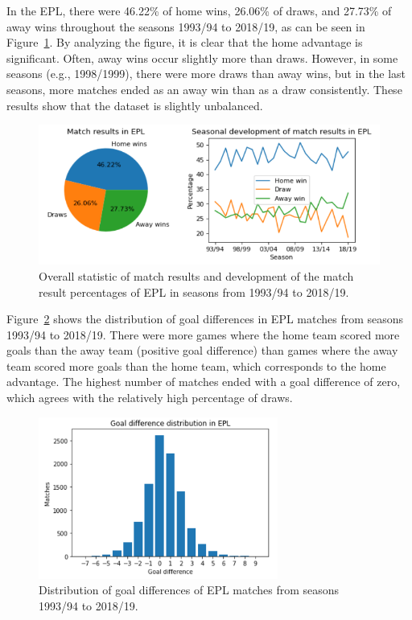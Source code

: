 \documentclass[thesis=M,english]{FITthesis}[2019/12/23]
\begin{document}
In the EPL, there were 46.22\% of home wins, 26.06\% of draws, and 27.73\% of away wins throughout the seasons 1993/94 to 2018/19, as can be seen in Figure~\ref{fig:epl_mr}. By analyzing the figure, it is clear that the home advantage is significant. Often, away wins occur slightly more than draws. However, in some seasons (e.g., 1998/1999), there were more draws than away wins, but in the last seasons, more matches ended as an away win than as a draw consistently. These results show that the dataset is slightly unbalanced.%
\begin{figure}[h]
    \centering
    \includegraphics[width=1\textwidth]{figures/epl_subgraph.png}
    \caption{Overall statistic of match results and development of the match result percentages of EPL in seasons from 1993/94 to 2018/19.}
    \label{fig:epl_mr}
\end{figure}

Figure~\ref{fig:epl_gd} shows the distribution of goal differences in EPL matches from seasons 1993/94 to 2018/19. There were more games where the home team scored more goals than the away team (positive goal difference) than games where the away team scored more goals than the home team, which corresponds to the home advantage. The highest number of matches ended with a goal difference of zero, which agrees with the relatively high percentage of draws.
\begin{figure}[h]
    \centering
    \includegraphics[width=0.7\textwidth]{figures/epl_gd.png}
    \caption{Distribution of goal differences of EPL matches from seasons 1993/94 to 2018/19.}
    \label{fig:epl_gd}
\end{figure}
\end{document}
